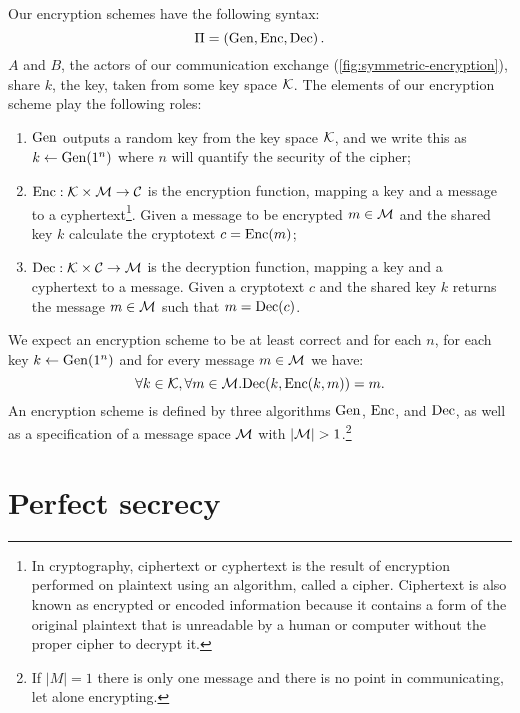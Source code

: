 Our encryption schemes have the following syntax:
\begin{equation*}
	\Pi = \left( \mathrm{Gen}, \allowbreak \mathrm{Enc}, \allowbreak \mathrm{Dec} \right).
\end{equation*}
$A$ and $B$, the actors of our communication exchange (\cref{fig:symmetric-encryption}), share $k$, the key, taken from some key space $\mathcal{K}$.
The elements of our encryption scheme play the following roles:
\begin{enumerate}
	\item $\mathrm{Gen}$ outputs a random key from the key space $\mathcal{K}$, and we write this as $k \leftarrow \mathrm{Gen}(1^n)$ where $n$ will quantify the security of the cipher;
	\item $\mathrm{Enc} : \mathcal{K} \times \mathcal{M} \to \mathcal{C}$ is the encryption function, mapping a key and a message to a cyphertext\footnote{In cryptography, ciphertext or cyphertext is the result of encryption performed on plaintext using an algorithm, called a cipher. Ciphertext is also known as encrypted or encoded information because it contains a form of the original plaintext that is unreadable by a human or computer without the proper cipher to decrypt it.}. Given a message to be encrypted $m \in \mathcal{M}$ and the shared key $k$ calculate the cryptotext $c = \mathrm{Enc}(m)$;
	\item $\mathrm{Dec} : \mathcal{K} \times \mathcal{C} \to \mathcal{M}$ is the decryption function, mapping a key and a cyphertext to a message. Given a cryptotext $c$ and the shared key $k$ returns the message $m \in \mathcal{M}$ such that $m = \mathrm{Dec}(c)$.
\end{enumerate}
We expect an encryption scheme to be at least correct and for each $n$, for each key $k \leftarrow \mathrm{Gen}(1^n)$ and for every message $m \in \mathcal{M}$ we have:
\begin{equation*}
	\forall k \in \mathcal{K}, \forall m \in \mathcal{M} . \mathrm{Dec}(k, \mathrm{Enc}(k, m)) = m.
\end{equation*}
An encryption scheme is defined by three algorithms $\mathrm{Gen}$, $\mathrm{Enc}$, and $\mathrm{Dec}$, as well as a specification of a message space $\mathcal{M}$ with $| \mathcal{M} | > 1$.\footnote{If $| M | = 1$ there is only one message and there is no point in communicating, let alone encrypting.}
\section{Perfect secrecy}

